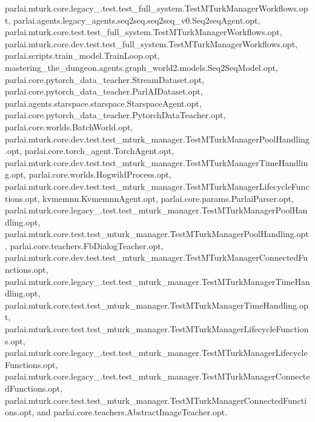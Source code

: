 parlai.\+mturk.\+core.\+legacy\+\_.\+test.\+test\+\_\+full\+\_\+system.\+Test\+M\+Turk\+Manager\+Workflows.\+opt, parlai.\+agents.\+legacy\+\_\+agents.\+seq2seq.\+seq2seq\+\_\+v0.\+Seq2seq\+Agent.\+opt, parlai.\+mturk.\+core.\+test.\+test\+\_\+full\+\_\+system.\+Test\+M\+Turk\+Manager\+Workflows.\+opt, parlai.\+mturk.\+core.\+dev.\+test.\+test\+\_\+full\+\_\+system.\+Test\+M\+Turk\+Manager\+Workflows.\+opt, parlai.\+scripts.\+train\+\_\+model.\+Train\+Loop.\+opt, mastering\+\_\+the\+\_\+dungeon.\+agents.\+graph\+\_\+world2.\+models.\+Seq2\+Seq\+Model.\+opt, parlai.\+core.\+pytorch\+\_\+data\+\_\+teacher.\+Stream\+Dataset.\+opt, parlai.\+core.\+pytorch\+\_\+data\+\_\+teacher.\+Parl\+A\+I\+Dataset.\+opt, parlai.\+agents.\+starspace.\+starspace.\+Starspace\+Agent.\+opt, parlai.\+core.\+pytorch\+\_\+data\+\_\+teacher.\+Pytorch\+Data\+Teacher.\+opt, parlai.\+core.\+worlds.\+Batch\+World.\+opt, parlai.\+mturk.\+core.\+dev.\+test.\+test\+\_\+mturk\+\_\+manager.\+Test\+M\+Turk\+Manager\+Pool\+Handling.\+opt, parlai.\+core.\+torch\+\_\+agent.\+Torch\+Agent.\+opt, parlai.\+mturk.\+core.\+dev.\+test.\+test\+\_\+mturk\+\_\+manager.\+Test\+M\+Turk\+Manager\+Time\+Handling.\+opt, parlai.\+core.\+worlds.\+Hogwild\+Process.\+opt, parlai.\+mturk.\+core.\+dev.\+test.\+test\+\_\+mturk\+\_\+manager.\+Test\+M\+Turk\+Manager\+Lifecycle\+Functions.\+opt, kvmemnn.\+Kvmemnn\+Agent.\+opt, parlai.\+core.\+params.\+Parlai\+Parser.\+opt, parlai.\+mturk.\+core.\+legacy\+\_.\+test.\+test\+\_\+mturk\+\_\+manager.\+Test\+M\+Turk\+Manager\+Pool\+Handling.\+opt, parlai.\+mturk.\+core.\+test.\+test\+\_\+mturk\+\_\+manager.\+Test\+M\+Turk\+Manager\+Pool\+Handling.\+opt, parlai.\+core.\+teachers.\+Fb\+Dialog\+Teacher.\+opt, parlai.\+mturk.\+core.\+dev.\+test.\+test\+\_\+mturk\+\_\+manager.\+Test\+M\+Turk\+Manager\+Connected\+Functions.\+opt, parlai.\+mturk.\+core.\+legacy\+\_.\+test.\+test\+\_\+mturk\+\_\+manager.\+Test\+M\+Turk\+Manager\+Time\+Handling.\+opt, parlai.\+mturk.\+core.\+test.\+test\+\_\+mturk\+\_\+manager.\+Test\+M\+Turk\+Manager\+Time\+Handling.\+opt, parlai.\+mturk.\+core.\+test.\+test\+\_\+mturk\+\_\+manager.\+Test\+M\+Turk\+Manager\+Lifecycle\+Functions.\+opt, parlai.\+mturk.\+core.\+legacy\+\_.\+test.\+test\+\_\+mturk\+\_\+manager.\+Test\+M\+Turk\+Manager\+Lifecycle\+Functions.\+opt, parlai.\+mturk.\+core.\+legacy\+\_.\+test.\+test\+\_\+mturk\+\_\+manager.\+Test\+M\+Turk\+Manager\+Connected\+Functions.\+opt, parlai.\+mturk.\+core.\+test.\+test\+\_\+mturk\+\_\+manager.\+Test\+M\+Turk\+Manager\+Connected\+Functions.\+opt, and parlai.\+core.\+teachers.\+Abstract\+Image\+Teacher.\+opt.

